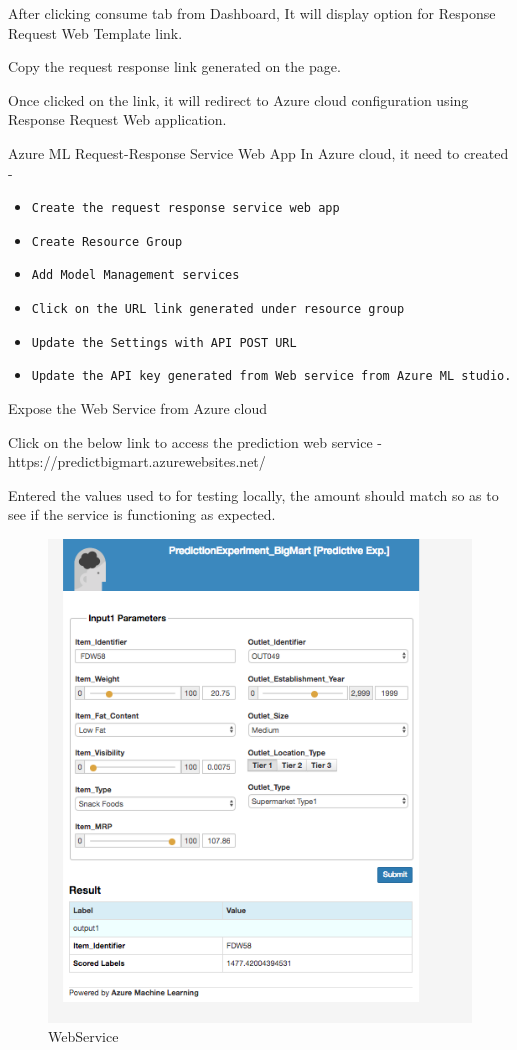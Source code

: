 After clicking consume tab from Dashboard, It will display option for 
Response Request Web Template link.

Copy the request response link generated on the page.

Once clicked on the link, it will redirect to Azure cloud configuration 
using Response Request Web application.

Azure ML Request-Response Service Web App
In Azure cloud, it need to created -

\begin{itemize}
\item \verb|Create the request response service web app|
\item \verb|Create Resource Group|
\item \verb|Add Model Management services|
\item \verb|Click on the URL link generated under resource group|
\item \verb|Update the Settings with API POST URL|
\item \verb|Update the API key generated from Web service from Azure ML studio.|
\end{itemize}

Expose the Web Service from Azure cloud

Click on the below link to access the prediction web service - 
https://predictbigmart.azurewebsites.net/

Entered the values used to for testing locally, the amount should 
match so as to see if the service is functioning as expected.

\begin{figure}[pic8]
	\centering\includegraphics[width=\columnwidth]{Images/mlstudio/WebService.png}
	\caption{WebService}\label{fig:WebService}
\end{figure}

